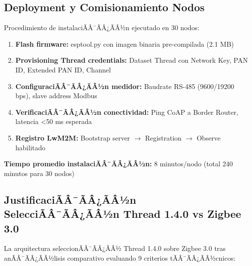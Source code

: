 \subsection{Deployment y Comisionamiento Nodos}
\label{sec:impl-nodos-deployment}

Procedimiento de instalaciÃÂ¯ÃÂ¿ÃÂ½n ejecutado en 30 nodos:

\begin{enumerate}
\item \textbf{Flash firmware:} esptool.py con imagen binaria pre-compilada (2.1 MB)
\item \textbf{Provisioning Thread credentials:} Dataset Thread con Network Key, PAN ID, Extended PAN ID, Channel
\item \textbf{ConfiguraciÃÂ¯ÃÂ¿ÃÂ½n medidor:} Baudrate RS-485 (9600/19200 bps), slave address Modbus
\item \textbf{VerificaciÃÂ¯ÃÂ¿ÃÂ½n conectividad:} Ping CoAP a Border Router, latencia <50 ms esperada
\item \textbf{Registro LwM2M:} Bootstrap server $\rightarrow$ Registration $\rightarrow$ Observe habilitado
\end{enumerate}

\textbf{Tiempo promedio instalaciÃÂ¯ÃÂ¿ÃÂ½n:} 8 minutos/nodo (total 240 minutos para 30 nodos)

\subsection{JustificaciÃÂ¯ÃÂ¿ÃÂ½n SelecciÃÂ¯ÃÂ¿ÃÂ½n Thread 1.4.0 vs Zigbee 3.0}
\label{sec:impl-thread-justification}

La arquitectura seleccionÃÂ¯ÃÂ¿ÃÂ½ Thread 1.4.0 sobre Zigbee 3.0 tras anÃÂ¯ÃÂ¿ÃÂ½lisis comparativo evaluando 9 criterios tÃÂ¯ÃÂ¿ÃÂ½cnicos:

